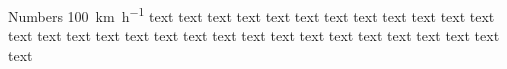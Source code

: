 \documentclass{IEEEtran}
\begin{document}
Numbers \SI{100}{\km\per\hour}
text text text text text text text text text text text text text text text
text text text text text text text text text text text text text text text
\end{document}

